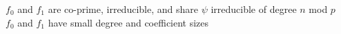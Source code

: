 \documentclass[preview]{standalone}
\begin{document}
$f_0$ and $f_1$ are co-prime, irreducible, and share $\psi$ irreducible of degree $n$ mod $p$\\$f_0$ and $f_1$ have small degree and coefficient sizes\\
\end{document}
